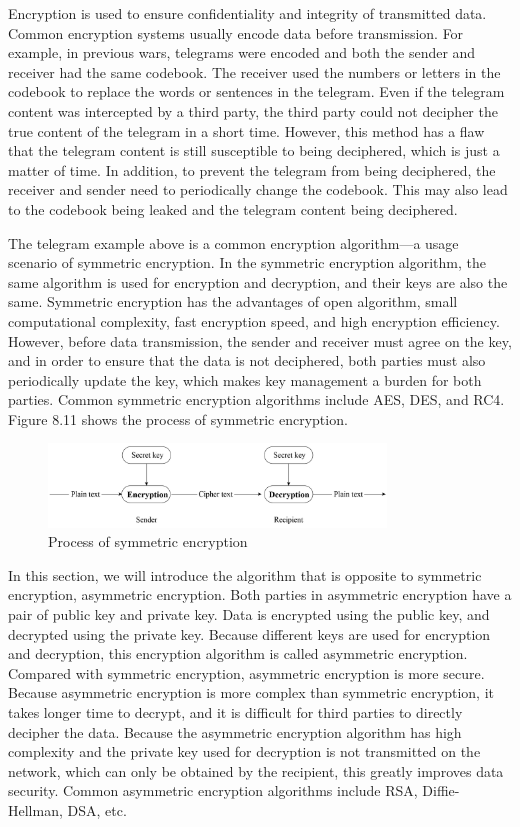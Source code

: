 \documentclass[a4paper,12pt,openany]{book}
\begin{document}
Encryption is used to ensure confidentiality and integrity of transmitted data. Common encryption systems usually encode data before transmission. For example, in previous wars, telegrams were encoded and both the sender and receiver had the same codebook. The receiver used the numbers or letters in the codebook to replace the words or sentences in the telegram. Even if the telegram content was intercepted by a third party, the third party could not decipher the true content of the telegram in a short time. However, this method has a flaw that the telegram content is still susceptible to being deciphered, which is just a matter of time. In addition, to prevent the telegram from being deciphered, the receiver and sender need to periodically change the codebook. This may also lead to the codebook being leaked and the telegram content being deciphered.

The telegram example above is a common encryption algorithm—a usage scenario of symmetric encryption. In the symmetric encryption algorithm, the same algorithm is used for encryption and decryption, and their keys are also the same. Symmetric encryption has the advantages of open algorithm, small computational complexity, fast encryption speed, and high encryption efficiency. However, before data transmission, the sender and receiver must agree on the key, and in order to ensure that the data is not deciphered, both parties must also periodically update the key, which makes key management a burden for both parties. Common symmetric encryption algorithms include AES, DES, and RC4. Figure 8.11 shows the process of symmetric encryption.

\begin{figure}[!h]
    \centering
    \includegraphics[width=0.8\textwidth]{D8Z/8-11}
    \caption{Process of symmetric encryption}
\end{figure}

In this section, we will introduce the algorithm that is opposite to symmetric encryption, asymmetric encryption. Both parties in asymmetric encryption have a pair of public key and private key. Data is encrypted using the public key, and decrypted using the private key. Because different keys are used for encryption and decryption, this encryption algorithm is called asymmetric encryption. Compared with symmetric encryption, asymmetric encryption is more secure. Because asymmetric encryption is more complex than symmetric encryption, it takes longer time to decrypt, and it is difficult for third parties to directly decipher the data. Because the asymmetric encryption algorithm has high complexity and the private key used for decryption is not transmitted on the network, which can only be obtained by the recipient, this greatly improves data security. Common asymmetric encryption algorithms include RSA, Diffie-Hellman, DSA, etc.
\end{document}
